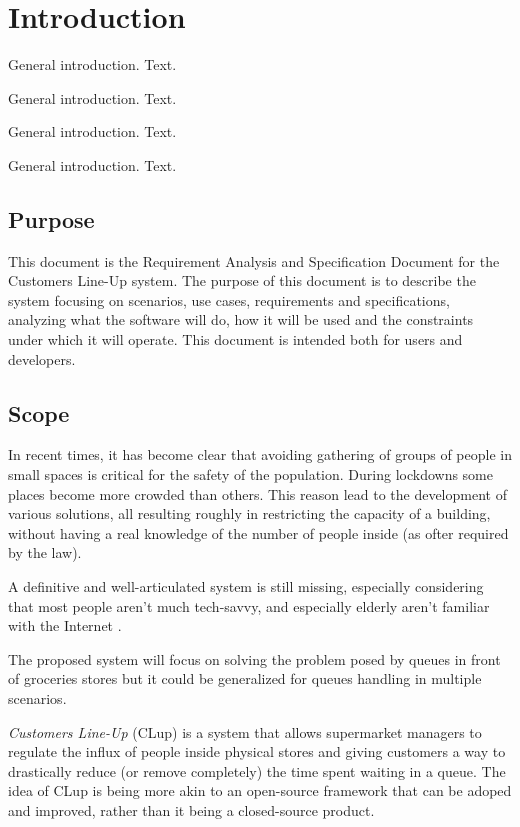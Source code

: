 \section{Introduction}\label{sec:intro}

General introduction. Text.

General introduction. Text.

General introduction. Text.

General introduction. Text.

\subsection{Purpose}
This document is the Requirement Analysis and Specification Document for the Customers Line-Up system.
The purpose of this document is to describe the system focusing on scenarios, use cases, requirements and 
specifications, analyzing what the software will do, how it will be used and the constraints under which it
will operate. This document is intended both for users and developers.

\subsection{Scope}
In recent times, it has become clear that avoiding gathering of groups of people in small spaces is critical
for the safety of the population. During lockdowns some places become more crowded than others. 
This reason lead to the development of various solutions, all resulting roughly in restricting the capacity
of a building, without having a real knowledge of the number of people inside (as ofter required by the law).

A definitive and well-articulated system is still missing, especially considering that most people aren't much
tech-savvy, and especially elderly aren't familiar with the Internet .

The proposed system will focus on solving the problem posed by queues in front of groceries stores but it could
be generalized for queues handling in multiple scenarios.

\emph{Customers Line-Up} (CLup) is a system that allows supermarket managers to regulate the influx of people
inside physical stores and giving customers a way to drastically reduce (or remove completely) the time spent
waiting in a queue. The idea of CLup is being more akin to an open-source framework that can be adoped and improved, rather
than it being a closed-source product.

